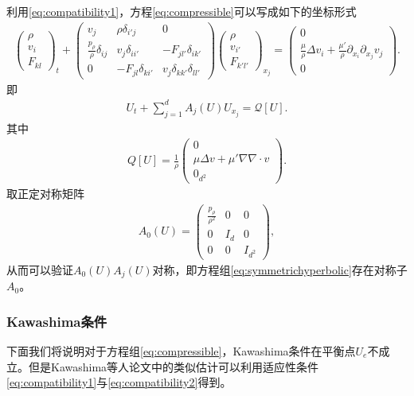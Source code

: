 \documentclass{article}
\begin{document}
利用\eqref{eq:compatibility1}，方程\eqref{eq:compressible}可以写成如下的坐标形式
\begin{eqnarray*}
  \left( \begin{array}{c} \rho \\ v_i \\ F_{kl} \end{array} \right)_t
  +
  \left( \begin{array}{ccc} v_j & \rho \delta_{i'j} & 0 \\
    \frac{p_\rho}{\rho} \delta_{ij} & v_j \delta_{ii'} & -F_{jl'} \delta_{ik'} \\
    0 & - F_{jl}\delta_{ki'}  & v_j \delta_{kk'} \delta_{ll'} \end{array} \right)
  \left( \begin{array}{c} \rho \\ v_{i'} \\ F_{k'l'} \end{array} \right)_{x_j}
=
\left( \begin{array}{c} 0 \\ \frac{\mu}{\rho} \Delta {v_i} + \frac{\mu'}{\rho} \partial_{x_i} \partial_{x_j} v_j  \\ 0 \end{array} \right).
\end{eqnarray*}
即
\begin{eqnarray}\label{eq:symmetrichyperbolic}
  U_t + \sum_{j=1}^d A_j(U) U_{x_j} = \mathcal{Q}[U].
\end{eqnarray}
其中
\begin{eqnarray*}
  Q[U] = \frac{1}{\rho}\left( \begin{array}{c} 0\\ \mu\Delta  v + \mu'\nabla \nabla \cdot  v  \\ 0_{d^2} \end{array} \right).
\end{eqnarray*}
取正定对称矩阵
\begin{eqnarray}
  A_0(U) = \left( \begin{array}{ccc} \frac{p_\rho}{\rho^2} & 0 & 0 \\
                                                   0 & I_d & 0 \\
						   0 & 0 & I_{d^2}\end{array} \right),
\end{eqnarray}
从而可以验证$A_0(U) A_j(U)$对称，即方程组\eqref{eq:symmetrichyperbolic}存在对称子$A_0$。

\subsubsection{Kawashima条件}
下面我们将说明对于方程组\eqref{eq:compressible}，Kawashima条件在平衡点$U_e$不成立。但是Kawashima等人论文\cite{}中的类似估计可以利用适应性条件\eqref{eq:compatibility1}与\eqref{eq:compatibility2}得到。
\end{document}
